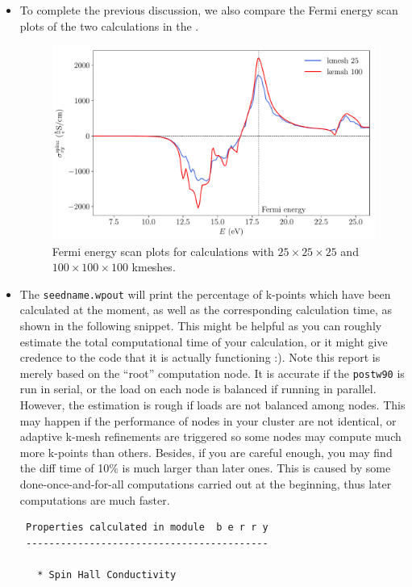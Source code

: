 \begin{itemize}
\item To complete the previous discussion, we also 
compare the Fermi energy scan plots of the two calculations in the . 
\begin{figure}[htb!]
\centering
\includegraphics[width=.8\columnwidth]{figure/example29/pt_shc_kmesh.pdf}
\caption{Fermi energy scan plots for calculations 
	with $25\times25\times25$ and $100\times100\times100$ kmeshes.}
\label{fig29.3}
\end{figure}

\item The {\tt seedname.wpout} will print the percentage of k-points which 
have been calculated at the moment, as well as the corresponding calculation time, as 
shown in the following snippet. 
This might be helpful as you can roughly 
estimate the total computational time 
of your calculation, or it might give credence to the code that it is actually functioning :). 
Note this report is merely based on the ``root'' computation node. It is accurate if the {\tt postw90} is run in serial, or the load on each node is balanced if running in parallel. However, the estimation is rough if loads are not balanced among nodes. This may happen if the performance of nodes in your cluster are not identical, or adaptive k-mesh refinements are triggered so some nodes may compute much more k-points than others. 
Besides, if you are careful enough, you may find the diff time of 10\% is much larger than later ones. This 
is caused by some done-once-and-for-all computations carried out at the beginning, thus 
later computations are much faster. 
\begin{tcolorbox}[title=Pt.wpout,sharp corners,boxrule=0.5pt]
{\small
\begin{verbatim}
 Properties calculated in module  b e r r y
 ------------------------------------------

   * Spin Hall Conductivity


\end{verbatim}}
\end{tcolorbox}
\end{itemize}
